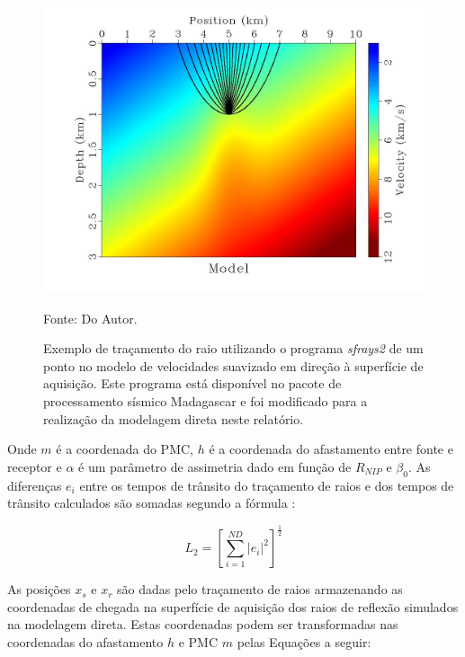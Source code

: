 \begin{figure}[H]
\caption{Exemplo de traçamento do raio utilizando o programa \textit{sfrays2}
de um ponto no modelo de velocidades suavizado em direção à superfície de aquisição.
Este programa está disponível no pacote de processamento sísmico Madagascar e foi
modificado para a realização da modelagem direta neste relatório.}
\begin{center}
\includegraphics[scale=0.3]{images/raioleque.jpg}
\vspace{-0.3cm}
\end{center}
\begin{center}
 Fonte: Do Autor.
\end{center}
\label{fig:9.6}
\end{figure}

Onde $m$ é a coordenada do PMC, $h$ é a coordenada do afastamento entre fonte e receptor e
$\alpha$ é um parâmetro de assimetria dado em função de $R_{NIP}$ e $\beta_0$.
As diferenças $e_i$ entre os tempos de trânsito do traçamento de raios e dos tempos de trânsito
calculados são somadas segundo a fórmula \cite{stoffa}:

\begin{equation}
\label{eq:9.2}
L_2 = \left[ \sum_{i=1}^{ND} |e_i|^2 \right]^\frac{1}{2}
\end{equation}

As posições $x_s$ e $x_r$ são dadas pelo traçamento de raios armazenando as coordenadas de chegada
na superfície de aquisição dos raios de reflexão simulados na modelagem direta. Estas coordenadas podem
ser transformadas nas coordenadas do afastamento $h$ e PMC $m$ pelas Equações a seguir:

